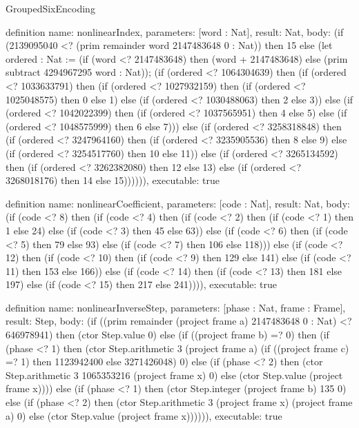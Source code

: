 \begin{lexlean}{GroupedSixEncoding}
\begin{semanticmodule}
definition{
  name: nonlinearIndex,
  parameters: [word : Nat],
  result: Nat,
  body: (if (2139095040 <? (prim remainder word 2147483648 0 : Nat)) then 15 else (let ordered : Nat := (if (word <? 2147483648) then (word + 2147483648) else (prim subtract 4294967295 word : Nat)); (if (ordered <? 1064304639) then (if (ordered <? 1033633791) then (if (ordered <? 1027932159) then (if (ordered <? 1025048575) then 0 else 1) else (if (ordered <? 1030488063) then 2 else 3)) else (if (ordered <? 1042022399) then (if (ordered <? 1037565951) then 4 else 5) else (if (ordered <? 1048575999) then 6 else 7))) else (if (ordered <? 3258318848) then (if (ordered <? 3247964160) then (if (ordered <? 3235905536) then 8 else 9) else (if (ordered <? 3254517760) then 10 else 11)) else (if (ordered <? 3265134592) then (if (ordered <? 3262382080) then 12 else 13) else (if (ordered <? 3268018176) then 14 else 15)))))),
  executable: true
}

definition{
  name: nonlinearCoefficient,
  parameters: [code : Nat],
  result: Nat,
  body: (if (code <? 8) then (if (code <? 4) then (if (code <? 2) then (if (code <? 1) then 1 else 24) else (if (code <? 3) then 45 else 63)) else (if (code <? 6) then (if (code <? 5) then 79 else 93) else (if (code <? 7) then 106 else 118))) else (if (code <? 12) then (if (code <? 10) then (if (code <? 9) then 129 else 141) else (if (code <? 11) then 153 else 166)) else (if (code <? 14) then (if (code <? 13) then 181 else 197) else (if (code <? 15) then 217 else 241)))),
  executable: true
}

definition{
  name: nonlinearInverseStep,
  parameters: [phase : Nat, frame : Frame],
  result: Step,
  body: (if ((prim remainder (project frame a) 2147483648 0 : Nat) <? 646978941) then (ctor Step.value 0) else (if ((project frame b) =? 0) then (if (phase <? 1) then (ctor Step.arithmetic 3 (project frame a) (if ((project frame c) =? 1) then 1123942400 else 3271426048) 0) else (if (phase <? 2) then (ctor Step.arithmetic 3 1065353216 (project frame x) 0) else (ctor Step.value (project frame x)))) else (if (phase <? 1) then (ctor Step.integer (project frame b) 135 0) else (if (phase <? 2) then (ctor Step.arithmetic 3 (project frame x) (project frame a) 0) else (ctor Step.value (project frame x)))))),
  executable: true
}


\end{semanticmodule}
\end{lexlean}
